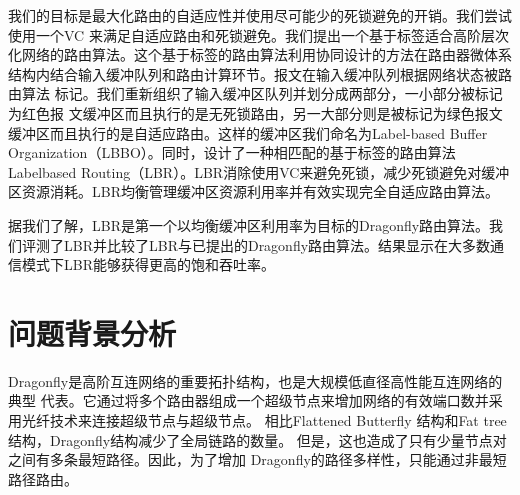 我们的目标是最大化路由的自适应性并使用尽可能少的死锁避免的开销。我们尝试使用一个VC 来满足自适应路由和死锁避免。我们提出一个基于标签适合高阶层次化网络的路由算法。这个基于标签的路由算法利用协同设计的方法在路由器微体系结构内结合输入缓冲队列和路由计算环节。报文在输入缓冲队列根据网络状态被路由算法
标记。我们重新组织了输入缓冲区队列并划分成两部分，一小部分被标记为红色报
文缓冲区而且执行的是无死锁路由，另一大部分则是被标记为绿色报文缓冲区而且执行的是自适应路由。这样的缓冲区我们命名为Label-based Buffer Organization（LBBO）。同时，设计了一种相匹配的基于标签的路由算法Label\-based Routing（LBR）。LBR消除使用VC来避免死锁，减少死锁避免对缓冲区资源消耗。LBR均衡管理缓冲区资源利用率并有效实现完全自适应路由算法。

据我们了解，LBR是第一个以均衡缓冲区利用率为目标的Dragonfly路由算法。我们评测了LBR并比较了LBR与已提出的Dragonfly路由算法。结果显示在大多数通信模式下LBR能够获得更高的饱和吞吐率。

\section{问题背景分析}

Dragonfly是高阶互连网络的重要拓扑结构，也是大规模低直径高性能互连网络的典型
代表。它通过将多个路由器组成一个超级节点来增加网络的有效端口数并采用光纤技术来连接超级节点与超级节点。
相比Flattened Butterfly
结构和Fat tree结构，Dragonfly结构减少了全局链路的数量。
但是，这也造成了只有少量节点对之间有多条最短路径。因此，为了增加
Dragonfly的路径多样性，只能通过非最短路径路由。

